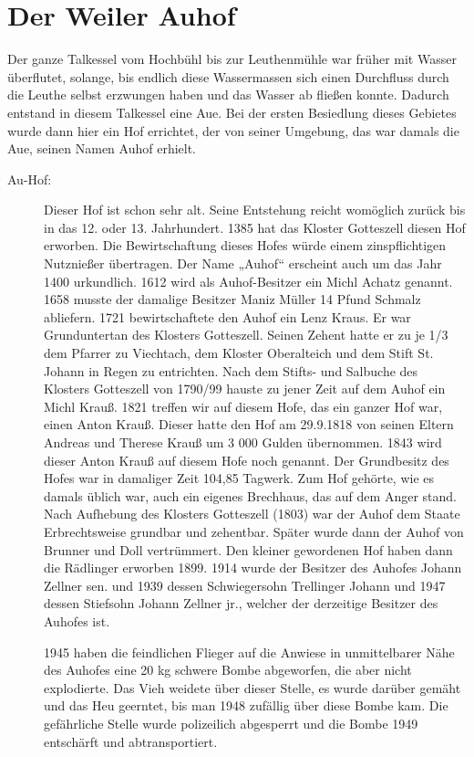 \documentclass[12pt,a4pager]{book}
\begin{document}
\section{Der Weiler Auhof}

Der ganze Talkessel vom Hochbühl bis zur Leuthenmühle war früher mit Wasser
überflutet, solange, bis endlich diese Wassermassen sich einen Durchfluss durch
die Leuthe selbst erzwungen haben und das Wasser ab fließen konnte. Dadurch
entstand in diesem Talkessel eine Aue. Bei der ersten Besiedlung dieses Gebietes
wurde dann hier ein Hof errichtet, der von seiner Umgebung, das war damals die
Aue, seinen Namen Auhof erhielt.

\begin{description}
\item[Au-Hof:] Dieser Hof ist schon sehr alt. Seine Entstehung reicht womöglich
zurück bis in das 12. oder 13. Jahrhundert. 1385 hat das Kloster Gotteszell
diesen Hof erworben. Die Bewirtschaftung dieses Hofes würde einem
zinspflichtigen Nutznießer übertragen. Der Name „Auhof“ erscheint auch um das
Jahr 1400 urkundlich. 1612 wird als Auhof-Besitzer ein Michl Achatz genannt.
1658 musste der damalige Besitzer Maniz Müller 14 Pfund Schmalz abliefern. 1721
bewirtschaftete den Auhof ein Lenz Kraus. Er war Grunduntertan des Klosters
Gotteszell. Seinen Zehent hatte er zu je 1/3 dem Pfarrer zu Viechtach, dem
Kloster Oberalteich und dem Stift St. Johann in Regen zu entrichten. Nach dem
Stifts- und Salbuche des Klosters Gotteszell von 1790/99 hauste zu jener Zeit
auf dem Auhof ein Michl Krauß. 1821 treffen wir auf diesem Hofe, das ein ganzer
Hof war, einen Anton Krauß. Dieser hatte den Hof am 29.9.1818 von seinen Eltern
Andreas und Therese Krauß um 3 000 Gulden übernommen. 1843 wird dieser Anton
Krauß auf diesem Hofe noch genannt. Der Grundbesitz des Hofes war in damaliger
Zeit 104,85 Tagwerk. Zum Hof gehörte, wie es damals üblich war, auch ein eigenes
Brechhaus, das auf dem Anger stand. Nach Aufhebung des Klosters Gotteszell
(1803) war der Auhof dem Staate Erbrechtsweise grundbar und zehentbar. Später
wurde dann der Auhof von Brunner und Doll vertrümmert. Den kleiner gewordenen
Hof haben dann die Rädlinger erworben 1899. 1914 wurde der Besitzer des Auhofes
Johann Zellner sen. und 1939 dessen Schwiegersohn Trellinger Johann und 1947
dessen Stiefsohn Johann Zellner jr., welcher der derzeitige Besitzer des Auhofes
ist.

1945 haben die feindlichen Flieger auf die Anwiese in unmittelbarer Nähe des
Auhofes eine 20 kg schwere Bombe abgeworfen, die aber nicht explodierte. Das
Vieh weidete über dieser Stelle, es wurde darüber gemäht und das Heu geerntet,
bis man 1948 zufällig über diese Bombe kam. Die gefährliche Stelle wurde
polizeilich abgesperrt und die Bombe 1949 entschärft und abtransportiert.


\end{description}
\end{document}
